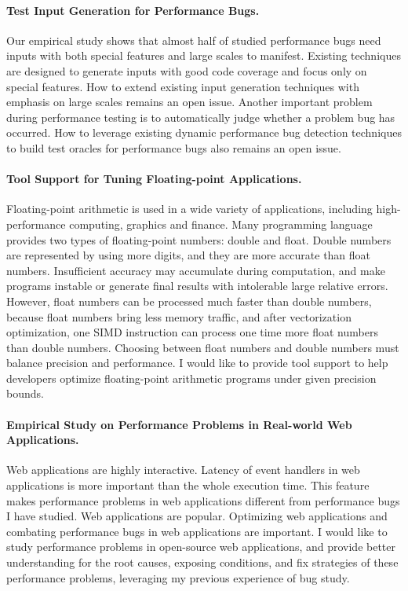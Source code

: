 \documentclass[10pt]{article}
\begin{document}
\paragraph{Test Input Generation for Performance Bugs.}
Our empirical study shows that almost half of studied performance bugs need inputs with both special features and large scales to manifest. 
Existing techniques are designed to generate inputs with good code coverage and focus only on special features.
How to extend existing input generation techniques with emphasis on large scales remains an open issue. 
Another important problem during performance testing is to automatically judge whether a problem bug has occurred. 
How to leverage existing dynamic performance bug detection techniques to build test oracles for performance bugs also remains an open issue.

\paragraph{Tool Support for Tuning Floating-point Applications.}
Floating-point arithmetic is used in a wide variety of applications, 
including high-performance computing, graphics and finance. 
Many programming language provides two types of floating-point numbers: double and float. 
Double numbers are represented by using more digits, and they are more accurate than float numbers. 
Insufficient accuracy may accumulate during computation, 
and make programs instable or generate final results with intolerable large relative errors. 
However, float numbers can be processed much faster than double numbers, 
because float numbers bring less memory traffic, 
and after vectorization optimization, one SIMD instruction can process one time more float numbers than double numbers. 
Choosing between float numbers and double numbers must balance precision and performance. 
I would like to provide tool support to help developers optimize floating-point arithmetic programs under given precision bounds. 

\paragraph{Empirical Study on  Performance Problems in Real-world Web Applications.}
Web applications are highly interactive. 
Latency of event handlers in web applications is more important than the whole execution time. 
This feature makes performance problems in web applications different from performance bugs I have studied. 
Web applications are popular. 
Optimizing web applications and combating performance bugs in web applications are important. 
I would like to study performance problems in open-source web applications, 
and provide better understanding for the root causes, 
exposing conditions, and fix strategies of these performance problems, 
leveraging my previous experience of bug study. 







\newpage


\end{document}
